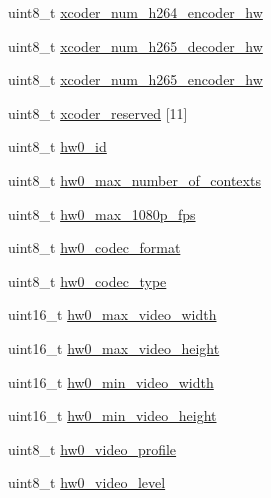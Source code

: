 \begin{DoxyCompactItemize}
\item 
uint8\+\_\+t \mbox{\hyperlink{struct__ni__nvme__identify_a17cec5244a0f89627a2378f14e545c91}{xcoder\+\_\+num\+\_\+h264\+\_\+encoder\+\_\+hw}}
\item 
uint8\+\_\+t \mbox{\hyperlink{struct__ni__nvme__identify_a4a970ec6f796425d35308041bac4caf5}{xcoder\+\_\+num\+\_\+h265\+\_\+decoder\+\_\+hw}}
\item 
uint8\+\_\+t \mbox{\hyperlink{struct__ni__nvme__identify_aeb0de0dbf192d147c629a261409e5436}{xcoder\+\_\+num\+\_\+h265\+\_\+encoder\+\_\+hw}}
\item 
uint8\+\_\+t \mbox{\hyperlink{struct__ni__nvme__identify_a9efc6e252c3c0c1e40c022f964154c8a}{xcoder\+\_\+reserved}} \mbox{[}11\mbox{]}
\item 
uint8\+\_\+t \mbox{\hyperlink{struct__ni__nvme__identify_a620a389a14fbc857fb17d50b26f96630}{hw0\+\_\+id}}
\item 
uint8\+\_\+t \mbox{\hyperlink{struct__ni__nvme__identify_a898b233340292eb430a91d801ca9d878}{hw0\+\_\+max\+\_\+number\+\_\+of\+\_\+contexts}}
\item 
uint8\+\_\+t \mbox{\hyperlink{struct__ni__nvme__identify_a699ccebb038de5ecbb121e17d11fa313}{hw0\+\_\+max\+\_\+1080p\+\_\+fps}}
\item 
uint8\+\_\+t \mbox{\hyperlink{struct__ni__nvme__identify_aefd35bf380dce286ada3959a85915fff}{hw0\+\_\+codec\+\_\+format}}
\item 
uint8\+\_\+t \mbox{\hyperlink{struct__ni__nvme__identify_a1bb61e0ad5628cee682225d2a79efcb0}{hw0\+\_\+codec\+\_\+type}}
\item 
uint16\+\_\+t \mbox{\hyperlink{struct__ni__nvme__identify_acfe257ee1ea6891f27af51966ddc7f62}{hw0\+\_\+max\+\_\+video\+\_\+width}}
\item 
uint16\+\_\+t \mbox{\hyperlink{struct__ni__nvme__identify_a222708ca4cf10469345bb5a416384ec8}{hw0\+\_\+max\+\_\+video\+\_\+height}}
\item 
uint16\+\_\+t \mbox{\hyperlink{struct__ni__nvme__identify_ae4fa0b91536f373fbc0f607465574b32}{hw0\+\_\+min\+\_\+video\+\_\+width}}
\item 
uint16\+\_\+t \mbox{\hyperlink{struct__ni__nvme__identify_aa8df441f9cc78e4ae70d6ee433b498b9}{hw0\+\_\+min\+\_\+video\+\_\+height}}
\item 
uint8\+\_\+t \mbox{\hyperlink{struct__ni__nvme__identify_adb3a39f435960f340c83ef36a7539211}{hw0\+\_\+video\+\_\+profile}}
\item 
uint8\+\_\+t \mbox{\hyperlink{struct__ni__nvme__identify_a11c0166fcb7821501a33537c12daacb3}{hw0\+\_\+video\+\_\+level}}

\end{DoxyCompactItemize}
